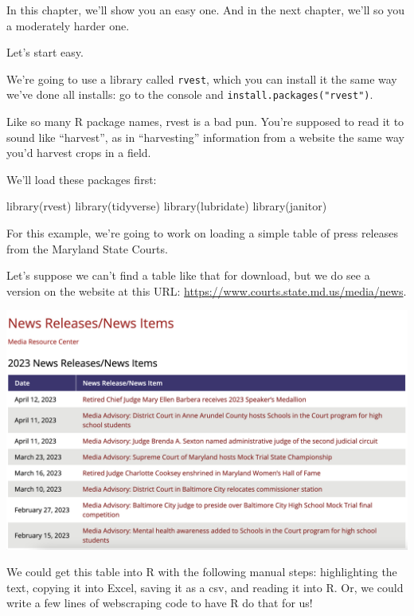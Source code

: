 \documentclass[
  letterpaper,
  DIV=11,
  numbers=noendperiod]{scrreprt}
\newenvironment{Shaded}{\begin{snugshade}}{\end{snugshade}}
\newcommand{\FunctionTok}[1]{\textcolor[rgb]{0.28,0.35,0.67}{#1}}
\newcommand{\NormalTok}[1]{\textcolor[rgb]{0.00,0.23,0.31}{#1}}
\begin{document}
In this chapter, we'll show you an easy one. And in the next chapter,
we'll so you a moderately harder one.

Let's start easy.

We're going to use a library called \texttt{rvest}, which you can
install it the same way we've done all installs: go to the console and
\texttt{install.packages("rvest")}.

Like so many R package names, rvest is a bad pun. You're supposed to
read it to sound like ``harvest'', as in ``harvesting'' information from
a website the same way you'd harvest crops in a field.

We'll load these packages first:

\begin{Shaded}
\begin{Highlighting}[]
\FunctionTok{library}\NormalTok{(rvest)}
\FunctionTok{library}\NormalTok{(tidyverse)}
\FunctionTok{library}\NormalTok{(lubridate)}
\FunctionTok{library}\NormalTok{(janitor)}
\end{Highlighting}
\end{Shaded}

For this example, we're going to work on loading a simple table of press
releases from the Maryland State Courts.

Let's suppose we can't find a table like that for download, but we do
see a version on the website at this URL:
\url{https://www.courts.state.md.us/media/news}.

\includegraphics[width=7.35in,height=\textheight]{./images/rvest1.png}

We could get this table into R with the following manual steps:
highlighting the text, copying it into Excel, saving it as a csv, and
reading it into R. Or, we could write a few lines of webscraping code to
have R do that for us!
\end{document}
